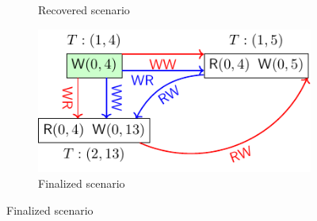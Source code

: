\begin{figure}[t]
\begin{subfigure}[b]{0.40\textwidth}
        \caption{Recovered scenario}
    \end{subfigure}\hspace{3ex} \pause
    \begin{subfigure}[b]{0.40\textwidth}
        \centering
        \includegraphics[width = \textwidth]{figs/galera-delete}
        \caption{Finalized scenario}
    \end{subfigure}
\end{figure}